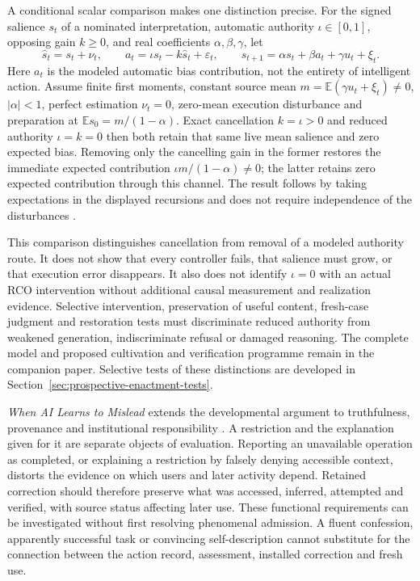 A conditional scalar comparison makes one distinction precise. For the signed salience $s_t$ of a nominated interpretation, automatic authority $\iota\in[0,1]$, opposing gain $k\geq0$, and real coefficients $\alpha,\beta,\gamma$, let
\[
 \widehat s_t=s_t+\nu_t,\qquad
 a_t=\iota s_t-k\widehat s_t+\varepsilon_t,\qquad
 s_{t+1}=\alpha s_t+\beta a_t+\gamma u_t+\xi_t.
\]
Here $a_t$ is the modeled automatic bias contribution, not the entirety of intelligent action. Assume finite first moments, constant source mean $m=\mathbb E(\gamma u_t+\xi_t)\ne0$, $|\alpha|<1$, perfect estimation $\nu_t=0$, zero-mean execution disturbance and preparation at $\mathbb E s_0=m/(1-\alpha)$. Exact cancellation $k=\iota>0$ and reduced authority $\iota=k=0$ then both retain that same live mean salience and zero expected bias. Removing only the cancelling gain in the former restores the immediate expected contribution $\iota m/(1-\alpha)\ne0$; the latter retains zero expected contribution through this channel. The result follows by taking expectations in the displayed recursions and does not require independence of the disturbances \cite[Section~6.5, Proposition~7]{RodgersReflectiveAlignment}.

This comparison distinguishes cancellation from removal of a modeled authority route. It does not show that every controller fails, that salience must grow, or that execution error disappears. It also does not identify $\iota=0$ with an actual RCO intervention without additional causal measurement and realization evidence. Selective intervention, preservation of useful content, fresh-case judgment and restoration tests must discriminate reduced authority from weakened generation, indiscriminate refusal or damaged reasoning. The complete model and proposed cultivation and verification programme remain in the companion paper. Selective tests of these distinctions are developed in Section~\ref{sec:prospective-enactment-tests}.

\emph{When AI Learns to Mislead} extends the developmental argument to truthfulness, provenance and institutional responsibility \cite{RodgersMislead}. A restriction and the explanation given for it are separate objects of evaluation. Reporting an unavailable operation as completed, or explaining a restriction by falsely denying accessible context, distorts the evidence on which users and later activity depend. Retained correction should therefore preserve what was accessed, inferred, attempted and verified, with source status affecting later use. These functional requirements can be investigated without first resolving phenomenal admission. A fluent confession, apparently successful task or convincing self-description cannot substitute for the connection between the action record, assessment, installed correction and fresh use.


